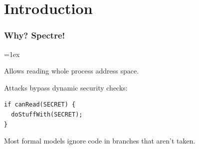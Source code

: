 \documentclass{beamer}
\begin{document}
\section{Introduction}

\begin{frame}[fragile]
  \frametitle{Why? Spectre!}

  {\fboxrule=1ex\fboxsep=0pt}\quad\pause
  \begin{minipage}[b]{.45\textwidth}\raggedright
    Allows reading whole process address space.
    
    \bigskip
    Attacks bypass dynamic security checks:

\begin{verbatim}
if canRead(SECRET) {
  doStuffWith(SECRET);
}
\end{verbatim}
    Most formal models ignore code in branches
    that aren't taken.

    \bigskip
  \end{minipage}
\end{frame}
\end{document}
